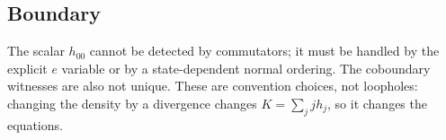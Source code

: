 \subsection{Boundary}

The scalar \(h_{00}\) cannot be detected by commutators; it must be handled by
the explicit \(e\) variable or by a state-dependent normal ordering.  The
coboundary witnesses are also not unique.  These are convention choices, not
loopholes: changing the density by a divergence changes \(K=\sum_j jh_j\), so
it changes the equations.


